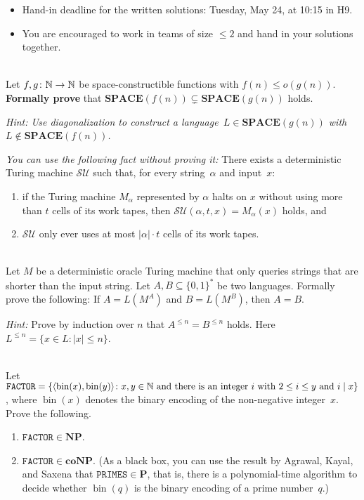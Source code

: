 \documentclass[english]{uebung_cs}
\begin{document}
\begin{itemize}
  \item Hand-in deadline for the written solutions: Tuesday, May 24, at 10:15 in H9.
  \item You are encouraged to work in teams of size $\le 2$ and hand in your solutions together.
\end{itemize}

\begin{aufgabe}[Diagonalization]\mbox{}\\
    Let $f,g\colon\mathbb{N}\to\mathbb{N}$ be space-constructible functions with $f(n)\le o(g(n))$.
    \textbf{Formally prove} that $\mathbf{SPACE}(f(n))\subsetneq\mathbf{SPACE}(g(n))$ holds.

    \textit{Hint: Use diagonalization to construct a language~$L\in\mathbf{SPACE}(g(n))$ with $L\not\in\mathbf{SPACE}(f(n))$.}

    \textit{You can use the following fact without proving it:}
    There exists a deterministic Turing machine $\mathcal{SU}$ such that, for every string~$\alpha$ and input~$x$:
    \begin{enumerate}
      \item if the Turing machine $M_\alpha$ represented by $\alpha$ halts on $x$ without using more than $t$ cells of its work tapes, then $\mathcal{SU}(\alpha,t,x)=M_\alpha(x)$ holds, and
      \item $\mathcal{SU}$ only ever uses at most $|\alpha|\cdot t$ cells of its work tapes.
    \end{enumerate}
\end{aufgabe}

\begin{aufgabe}[Oracles]\mbox{}\\
  Let $M$ be a deterministic oracle Turing machine that only queries strings 
  that are shorter than the input string.
  Let $A,B\subseteq\{0,1\}^\ast$ be two languages.
  Formally prove the following: If $A = L(M^A)$ and $B = L(M^B)$, then $A = B$.
  
  \emph{Hint:} Prove by induction over $n$ that $A^{\le n} = B^{\le n}$ holds. Here $L^{\le n}=\{x\in L\colon |x|\le n\}$.
\end{aufgabe}

\begin{aufgabe}\mbox{}\\
  Let $\mathtt{FACTOR}=\{\langle\operatorname{bin}(x),\operatorname{bin}(y)\rangle\colon \text{$x,y\in\mathbb{N}$ and there is an integer $i$ with $2\le i \le y$ and $i \mathrel{|} x$}\}$,
  where $\operatorname{bin}(x)$ denotes the binary encoding of the non-negative integer~$x$.
  Prove the following.
  \begin{enumerate}
    \item $\mathtt{FACTOR}\in\mathbf{NP}$.
    \item $\mathtt{FACTOR}\in\mathbf{coNP}$. (As a black box, you can use the result by Agrawal, Kayal, and Saxena that $\mathtt{PRIMES}\in\mathbf{P}$, that is, there is a polynomial-time algorithm to decide whether $\operatorname{bin}(q)$ is the binary encoding of a prime number~$q$.)
  \end{enumerate}
\end{aufgabe}
\end{document}
